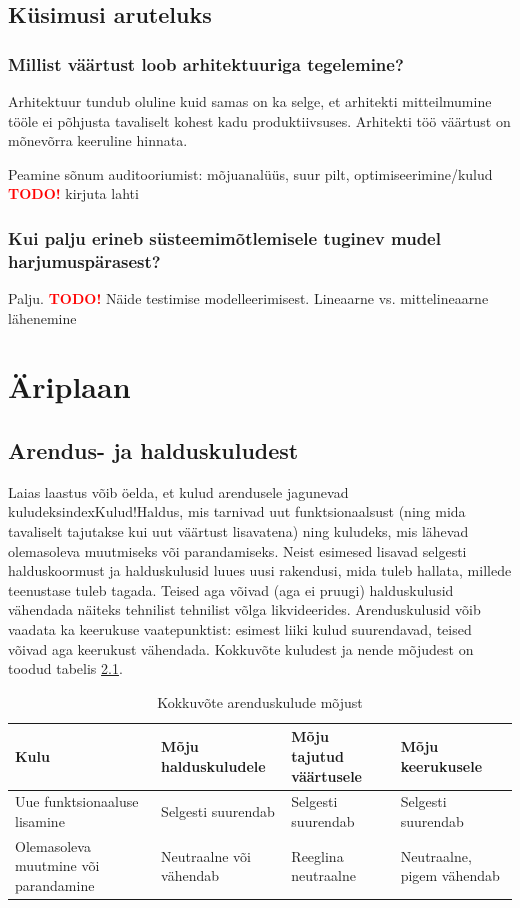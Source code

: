 \documentclass{tufte-book}
\newcommand{\TODO}{\textcolor{red}{\bf TODO!}\xspace}
\begin{document}
	
\section{Küsimusi aruteluks}
\subsection{Millist väärtust loob arhitektuuriga tegelemine?}
Arhitektuur tundub oluline kuid samas on ka selge, et arhitekti mitteilmumine tööle ei põhjusta tavaliselt kohest kadu produktiivsuses. Arhitekti töö väärtust on mõnevõrra keeruline hinnata. 

Peamine sõnum auditooriumist: mõjuanalüüs, suur pilt, optimiseerimine/kulud
\TODO kirjuta lahti

\subsection{Kui palju erineb süsteemimõtlemisele tuginev mudel harjumuspärasest?}
Palju.
\TODO Näide testimise modelleerimisest. Lineaarne vs. mittelineaarne lähenemine

\chapter{Äriplaan}
\section{Arendus- ja halduskuludest}
\label{sec:kulud}
Laias laastus võib öelda, et kulud arendusele jagunevad kuludeksindex{Kulud!Haldus}, mis tarnivad uut funktsionaalsust (ning mida tavaliselt tajutakse kui uut väärtust lisavatena) ning kuludeks, mis lähevad olemasoleva muutmiseks või parandamiseks. Neist esimesed lisavad selgesti halduskoormust ja halduskulusid luues uusi rakendusi, mida tuleb hallata, millede teenustase tuleb tagada. Teised aga võivad (aga ei pruugi) halduskulusid vähendada näiteks tehnilist tehnilist võlga likvideerides. Arenduskulusid võib vaadata ka keerukuse vaatepunktist: esimest liiki kulud suurendavad, teised võivad aga keerukust vähendada. Kokkuvõte kuludest ja nende mõjudest on toodud tabelis \ref{tab:arendus}.

\begin{table}
	\begin{center}
		\begin{tabular}{p{2.8cm}p{1.7cm}p{1.5cm}p{2cm}}
		\toprule
Kulu & Mõju haldus\-kuludele & Mõju tajutud väärtusele & Mõju \mbox{keerukusele} \\
\midrule

Uue funktsionaaluse \mbox{lisamine} & Selgesti \mbox{suurendab} & Selgesti \mbox{suurendab} & Selgesti \mbox{suurendab} \\
\addlinespace
Olemasoleva muutmine või parandamine & Neutraalne või vähendab & Reeglina \mbox{neutraalne} & Neutraalne, \mbox{pigem} vähendab \\

\bottomrule
		\end{tabular}
		\caption{Kokkuvõte arenduskulude mõjust}
		\label{tab:arendus}
	\end{center}
\end{table}
\end{document}
